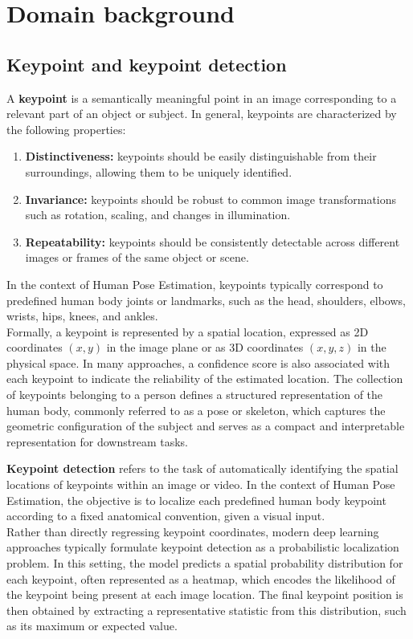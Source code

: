 \chapter{Domain background}

\section{Keypoint and keypoint detection}
A \textbf{keypoint} is a semantically meaningful point in an image corresponding to a relevant part of an object or subject. In general, keypoints are characterized by the 
following properties:
\begin{enumerate}
    \item \textbf{Distinctiveness:} keypoints should be easily distinguishable from their surroundings, allowing them to be uniquely identified.
    \item \textbf{Invariance:} keypoints should be robust to common image transformations such as rotation, scaling, and changes in illumination.
    \item \textbf{Repeatability:} keypoints should be consistently detectable across different images or frames of the same object or scene.
\end{enumerate}
In the context of Human Pose Estimation, keypoints typically correspond to predefined human body joints or landmarks, such as the head, shoulders, elbows, wrists, hips, 
knees, and ankles.\\
Formally, a keypoint is represented by a spatial location, expressed as 2D coordinates \((x,y)\) in the image plane or as 3D coordinates \((x,y,z)\) in the physical space. 
In many approaches, a confidence score is also associated with each keypoint to indicate the reliability of the estimated location. The collection of keypoints 
belonging to a person defines a structured representation of the human body, commonly referred to as a pose or skeleton, which captures the geometric configuration of 
the subject and serves as a compact and interpretable representation for downstream tasks.


\textbf{Keypoint detection} refers to the task of automatically identifying the spatial locations of keypoints within an image or video. In the context of Human Pose Estimation, the objective is to localize each predefined human 
body keypoint according to a fixed anatomical convention, given a visual input.\\
Rather than directly regressing keypoint coordinates, modern deep learning approaches typically formulate keypoint detection as a probabilistic localization problem. In this setting, the model predicts a spatial probability 
distribution for each keypoint, often represented as a heatmap, which encodes the likelihood of the keypoint being present at each image location. The final keypoint position is then obtained by extracting a representative statistic 
from this distribution, such as its maximum or expected value.